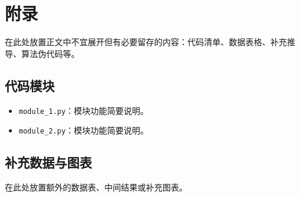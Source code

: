 \documentclass[12pt,a4paper]{article}
\begin{document}
\section{附录}

在此处放置正文中不宜展开但有必要留存的内容：代码清单、数据表格、补充推导、算法伪代码等。

\subsection{代码模块}

\begin{itemize}
    \item \texttt{module\_1.py}：模块功能简要说明。
    \item \texttt{module\_2.py}：模块功能简要说明。
\end{itemize}

\subsection{补充数据与图表}

在此处放置额外的数据表、中间结果或补充图表。
\end{document}
